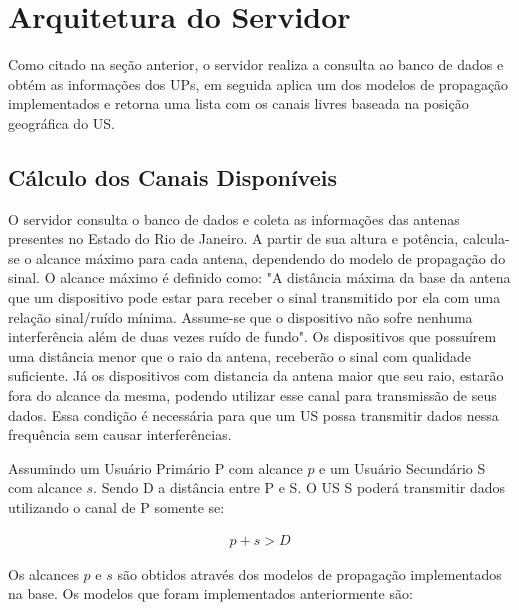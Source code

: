 \section{Arquitetura do Servidor}

Como citado na seção anterior, o servidor realiza a consulta ao banco de dados e obtém as informações dos UPs, em seguida aplica um dos modelos de propagação implementados e retorna uma lista com os canais livres baseada na posição geográfica do US.

\subsection{Cálculo dos Canais Disponíveis}

O servidor consulta o banco de dados e coleta as informações das antenas presentes no Estado do Rio de Janeiro. A partir de sua altura e potência, calcula-se o alcance máximo para cada antena, dependendo do modelo de propagação do sinal. O alcance máximo é definido como: "A distância máxima da base da antena que um dispositivo pode estar para receber o sinal transmitido por ela com uma relação sinal/ruído mínima. Assume-se que o dispositivo não sofre nenhuma interferência além de duas vezes ruído de fundo". Os dispositivos que possuírem uma distância menor que o raio da antena, receberão o sinal com qualidade suficiente. Já os dispositivos com distancia da antena maior que seu raio, estarão fora do alcance da mesma, podendo utilizar esse canal para transmissão de seus dados. Essa condição é necessária para que um US possa transmitir dados nessa frequência sem causar interferências.

Assumindo um Usuário Primário P com alcance \begin{math}p\end{math} e um Usuário Secundário S com alcance \begin{math}s\end{math}. Sendo D a distância entre P e S. O US S poderá transmitir dados utilizando o canal de P somente se:

\begin{align}
  \label{cantransmitdata} p + s > D
\end{align}

Os alcances \begin{math} p \end{math} e \begin{math} s \end{math} são obtidos através dos modelos de propagação implementados na base. Os modelos que foram implementados anteriormente são: 

